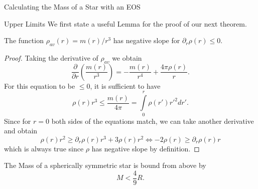 \begin{section}{Calculating the Mass of a Star with an EOS}
\begin{subsection}{Upper Limits}
We first state a useful Lemma for the proof of our next theorem.
\begin{lemma}
	The function $\rho_{av}(r)=m(r)/r^3$ has negative slope for $\partial_r\rho(r)\leq0$.
\end{lemma}
\begin{proof}
	Taking the derivative of $\rho_{av}$ we obtain 
	\begin{equation}
		\frac{\partial}{\partial r}\left(\frac{m(r)}{r^3}\right) = -\frac{m(r)}{r^4} + \frac{4\pi\rho(r)}{r}.
	\end{equation}
	For this equation to be $\leq0$, it is sufficient to have
	\begin{equation}
		\rho(r)r^3\leq\frac{m(r)}{4\pi}=\int\limits_0^r\rho(r')r'^2dr'.
	\end{equation}
	Since for $r=0$ both sides of the equations match, we can take another derivative and obtain 
	\begin{equation}
		\rho(r)r^2\geq\partial_r\rho(r)r^3+3\rho(r)r^2 \Leftrightarrow -2\rho(r) \geq \partial_r\rho(r)r
	\end{equation}
	which is always true since $\rho$ has negative slope by definition.
\end{proof}\noindent
\begin{theorem}
	The Mass of a spherically symmetric star is bound from above by
	\begin{equation}
		M < \frac{4}{9}R.
	\end{equation}

\end{theorem}
\end{subsection}
\end{section}
